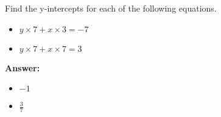  Find the y-intercepts for each of the following equations. \begin{itemize}\item \( y \times 7 + x \times 3 = -7 \)\item \( y \times 7 + x \times 7 = 3 \)\end{itemize}

        \textbf{Answer:} \begin{itemize}\item \( -1 \)\item \( \frac{3}{7} \)\end{itemize}
